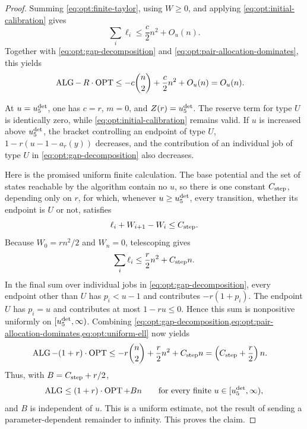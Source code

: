 \begin{proof}
Summing \eqref{eq:opt:finite-taylor}, using $W\ge0$, and applying
\eqref{eq:opt:initial-calibration} gives
\begin{equation}
 \sum_i\ell_i\le\frac c2n^2+O_u(n).
 \label{eq:opt:ell-telescope}
\end{equation}
Together with \eqref{eq:opt:gap-decomposition} and
\eqref{eq:opt:pair-allocation-dominates}, this yields
\begin{align}
 \operatorname{ALG}-\,R\cdot\operatorname{OPT}
 &\le -c\binom n2+\frac c2n^2+O_u(n)
 =O_u(n).
 \label{eq:opt:adaptive-middle-upper}
\end{align}

At $u=u_{5}^{\mathrm{det}}$, one has $c=r$, $m=0$, and
$Z(r)=u_{5}^{\mathrm{det}}$.  The reserve term for type $U$ is identically zero,
while
\eqref{eq:opt:initial-calibration} remains valid.  If $u$ is increased
above $u_{5}^{\mathrm{det}}$, the bracket controlling an endpoint of type $U$,
$1-r(u-1-a_r(y))$ decreases, and the contribution of an individual job of
type $U$ in
\eqref{eq:opt:gap-decomposition} also decreases.

Here is the promised uniform finite calculation.  The base potential and the
set of states reachable by the algorithm contain no $u$, so there is one
constant $C_{\rm step}$, depending only on $r$, for which, whenever
$u\ge u_{5}^{\mathrm{det}}$, every transition, whether its endpoint is $U$ or not,
satisfies
\[
 \ell_i+W_{i+1}-W_i\le C_{\rm step}.
\]
Because $W_0=rn^2/2$ and $W_n=0$, telescoping gives
\begin{equation}
 \sum_i\ell_i\le\frac r2n^2+C_{\rm step}n.
 \label{eq:opt:uniform-ell}
\end{equation}
In the final sum over individual jobs in \cref{eq:opt:gap-decomposition},
every endpoint other
than $U$ has $p_i<u-1$ and contributes $-r(1+p_i)$.  The endpoint $U$ has
$p_i=u$ and contributes at most $1-r u\le0$.  Hence this sum is
nonpositive uniformly on
$[u_{5}^{\mathrm{det}},\infty)$.  Combining
\cref{eq:opt:gap-decomposition,eq:opt:pair-allocation-dominates,eq:opt:uniform-ell}
now yields
\begin{align}
 \operatorname{ALG}-(1+r)\cdot\operatorname{OPT}
 &\le-r\binom n2+\frac r2n^2+C_{\rm step}n
   =\left(C_{\rm step}+\frac r2\right)n.
 \label{eq:opt:uniform-high-gap}
\end{align}
Thus, with $B=C_{\rm step}+r/2$,
\begin{equation}
 \operatorname{ALG}\le(1+r)\cdot\operatorname{OPT}+B n
 \qquad\text{for every finite }u\in[u_{5}^{\mathrm{det}},\infty),
 \label{eq:opt:uniform-high-upper}
\end{equation}
and $B$ is independent of $u$.  This is a uniform estimate, not the result
of sending a parameter-dependent remainder to infinity.
This proves the claim.
\end{proof}

